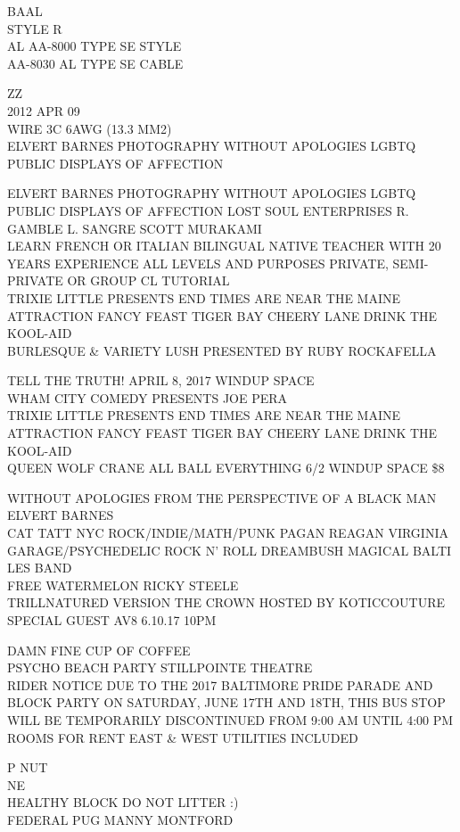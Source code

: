 \documentclass[10pt,letterpaper]{article}
\begin{document}
BAAL\\
STYLE R\\
AL AA{-}8000 TYPE SE STYLE\\
AA{-}8030 AL TYPE SE CABLE

ZZ\\
2012 APR 09\\
WIRE 3C 6AWG (13.3 MM2)\\
ELVERT BARNES PHOTOGRAPHY WITHOUT APOLOGIES LGBTQ PUBLIC DISPLAYS OF AFFECTION

ELVERT BARNES PHOTOGRAPHY WITHOUT APOLOGIES LGBTQ PUBLIC DISPLAYS OF AFFECTION LOST SOUL ENTERPRISES R. GAMBLE L. SANGRE SCOTT MURAKAMI\\
LEARN FRENCH OR ITALIAN BILINGUAL NATIVE TEACHER WITH 20 YEARS EXPERIENCE ALL LEVELS AND PURPOSES PRIVATE, SEMI{-}PRIVATE OR GROUP CL TUTORIAL\\
TRIXIE LITTLE PRESENTS END TIMES ARE NEAR THE MAINE ATTRACTION FANCY FEAST TIGER BAY CHEERY LANE DRINK THE KOOL{-}AID\\
BURLESQUE \& VARIETY LUSH PRESENTED BY RUBY ROCKAFELLA

TELL THE TRUTH! APRIL 8, 2017 WINDUP SPACE\\
WHAM CITY COMEDY PRESENTS JOE PERA\\
TRIXIE LITTLE PRESENTS END TIMES ARE NEAR THE MAINE ATTRACTION FANCY FEAST TIGER BAY CHEERY LANE DRINK THE KOOL{-}AID\\
QUEEN WOLF CRANE ALL BALL EVERYTHING 6/2 WINDUP SPACE \$8

WITHOUT APOLOGIES FROM THE PERSPECTIVE OF A BLACK MAN ELVERT BARNES\\
CAT TATT NYC ROCK/INDIE/MATH/PUNK PAGAN REAGAN VIRGINIA GARAGE/PSYCHEDELIC ROCK N' ROLL DREAMBUSH MAGICAL BALTI LES BAND\\
FREE WATERMELON RICKY STEELE\\
TRILLNATURED VERSION THE CROWN HOSTED BY KOTICCOUTURE SPECIAL GUEST AV8 6.10.17 10PM

DAMN FINE CUP OF COFFEE\\
PSYCHO BEACH PARTY STILLPOINTE THEATRE\\
RIDER NOTICE DUE TO THE 2017 BALTIMORE PRIDE PARADE AND BLOCK PARTY ON SATURDAY, JUNE 17TH AND 18TH, THIS BUS STOP WILL BE TEMPORARILY DISCONTINUED FROM 9:00 AM UNTIL 4:00 PM\\
ROOMS FOR RENT EAST \& WEST UTILITIES INCLUDED

P NUT\\
NE\\
HEALTHY BLOCK DO NOT LITTER :)\\
FEDERAL PUG MANNY MONTFORD
\end{document}
